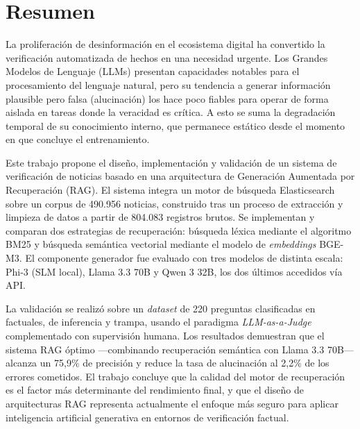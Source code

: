 

\chapter*{Resumen}

La proliferación de desinformación en el ecosistema digital ha convertido la verificación automatizada de hechos en una necesidad urgente. Los Grandes Modelos de Lenguaje (LLMs) presentan capacidades notables para el procesamiento del lenguaje natural, pero su tendencia a generar información plausible pero falsa (alucinación) los hace poco fiables para operar de forma aislada en tareas donde la veracidad es crítica. A esto se suma la degradación temporal de su conocimiento interno, que permanece estático desde el momento en que concluye el entrenamiento.

Este trabajo propone el diseño, implementación y validación de un sistema de verificación de noticias basado en una arquitectura de Generación Aumentada por Recuperación (RAG). El sistema integra un motor de búsqueda Elasticsearch sobre un corpus de 490.956 noticias, construido tras un proceso de extracción y limpieza de datos a partir de 804.083 registros brutos. Se implementan y comparan dos estrategias de recuperación: búsqueda léxica mediante el algoritmo BM25 y búsqueda semántica vectorial mediante el modelo de \textit{embeddings} BGE-M3. El componente generador fue evaluado con tres modelos de distinta escala: Phi-3 (SLM local), Llama 3.3 70B y Qwen 3 32B, los dos últimos accedidos vía API.

La validación se realizó sobre un \textit{dataset} de 220 preguntas clasificadas en factuales, de inferencia y trampa, usando el paradigma \textit{LLM-as-a-Judge} complementado con supervisión humana. Los resultados demuestran que el sistema RAG óptimo —combinando recuperación semántica con Llama 3.3 70B— alcanza un 75,9\% de precisión y reduce la tasa de alucinación al 2,2\% de los errores cometidos. El trabajo concluye que la calidad del motor de recuperación es el factor más determinante del rendimiento final, y que el diseño de arquitecturas RAG representa actualmente el enfoque más seguro para aplicar inteligencia artificial generativa en entornos de verificación factual.

